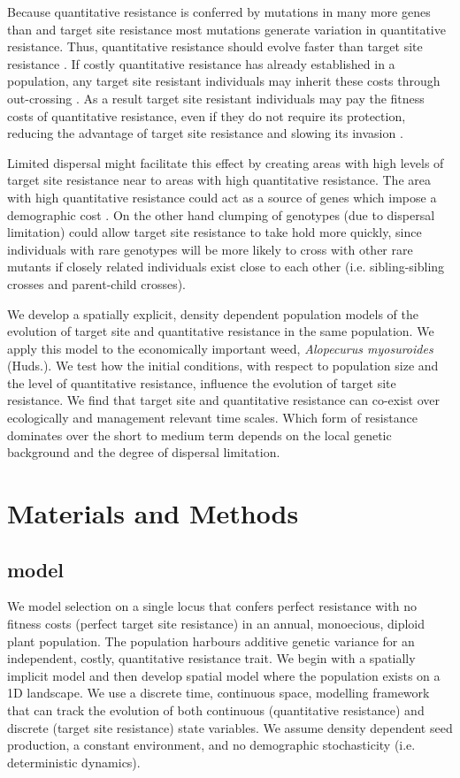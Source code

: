 \documentclass[10pt,letterpaper]{article}
\begin{document}
Because quantitative resistance is conferred by mutations in many more genes \cite{petit2010, Busi2013} than and target site resistance most mutations generate variation in quantitative resistance. Thus, quantitative resistance should evolve faster than target site resistance \cite{Dely2010newPhy}. If costly quantitative resistance has already established in a population, any target site resistant individuals may inherit these costs through out-crossing \cite{Yeam2015}. As a result target site resistant individuals may pay the fitness costs of quantitative resistance, even if they do not require its protection, reducing the advantage of target site resistance and slowing its invasion \cite{Chev2008}. 

Limited dispersal might facilitate this effect by creating areas with high levels of target site resistance near to areas with high quantitative resistance. The area with high quantitative resistance could act as a source of genes which impose a demographic cost \cite{Dely2010, Yeam2015}. On the other hand clumping of genotypes (due to dispersal limitation) could allow target site resistance to take hold more quickly, since individuals with rare genotypes will be more likely to cross with other rare mutants if closely related individuals exist close to each other (i.e. sibling-sibling crosses and parent-child crosses).

We develop a spatially explicit, density dependent population models of the evolution of target site and quantitative resistance in the same population. We apply this model to the economically important weed, \textit{Alopecurus myosuroides} (Huds.). We test how the initial conditions, with respect to population size and the level of quantitative resistance, influence the  evolution of target site resistance. We find that target site and quantitative resistance can co-exist over ecologically and management relevant time scales. Which form of resistance dominates over the short to medium term depends on the local genetic background and the degree of dispersal limitation. 

\section*{Materials and Methods}
\subsection*{model}
We model selection on a single locus that confers perfect resistance with no fitness costs (perfect target site resistance) in an annual, monoecious, diploid plant population. The population harbours additive genetic variance for an independent, costly, quantitative resistance trait. We begin with a spatially implicit model and then develop spatial model where the population exists on a 1D landscape. We use a discrete time, continuous space, modelling framework that can track the evolution of both continuous (quantitative resistance) and discrete (target site resistance) state variables. We assume density dependent seed production, a constant environment, and no demographic stochasticity (i.e. deterministic dynamics).      
\end{document}
